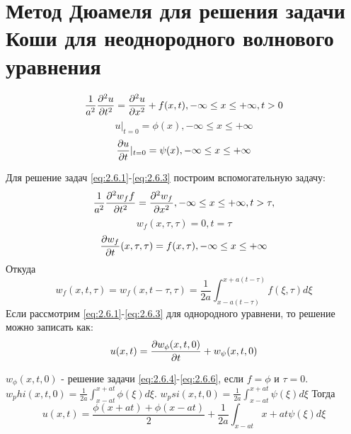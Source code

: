 \documentclass[../main.tex]{subfiles}
\begin{document}
\section{Метод Дюамеля для решения задачи Коши для неоднородного волнового уравнения}

\begin{equation}
    \label{eq:2.6.1}
    \frac{1}{a^2}\frac{\partial ^2u}{\partial t^2} = \frac{\partial ^2u}{\partial x^2} + f(x, t), -\infty \leq x \leq +\infty, t > 0
\end{equation}
\begin{equation}
    \label{eq:2.6.2}
    u|_{t=0} = \phi(x), -\infty \leq x \leq +\infty
\end{equation}
\begin{equation}
    \label{eq:2.6.3}
    \frac{\partial u}{\partial t}|_{t=0}=\psi(x), -\infty \leq x \leq +\infty
\end{equation}

Для решение задач \eqref{eq:2.6.1}-\eqref{eq:2.6.3} построим вспомогательную задачу: 
\begin{equation}
    \label{eq:2.6.4}
    \frac{1}{a^2}\frac{\partial ^2w_ff}{\partial t^2}=\frac{\partial ^2w_f}{\partial x^2}, -\infty \leq x \leq +\infty, t > \tau,
\end{equation}
\begin{equation}
    \label{eq:2.6.5}
    w_f(x, \tau, \tau) = 0, t = \tau
\end{equation}
\begin{equation}
    \label{eq:2.6.6}
    \frac{\partial w_f}{\partial t}(x, \tau, \tau) = f(x, \tau), -\infty \leq x \leq +\infty
\end{equation}
Откуда 
$$
    w_f(x, t, \tau)=w_f(x, t-\tau,\tau) = \frac{1}{2a}\int_{x-a(t-\tau)}^{x+a(t-\tau)}f(\xi, \tau)d\xi
$$
Если рассмотрим \eqref{eq:2.6.1}-\eqref{eq:2.6.3} для однородного уравнени, то решение можно записать как:
\begin{equation}
    u(x, t)=\frac{\partial w_\phi(x, t, 0)}{\partial t} + w_\psi(x, t, 0)
\end{equation}

$w_\phi(x, t, 0)$ - решение задачи \eqref{eq:2.6.4}-\eqref{eq:2.6.6}, 
если $f = \phi$ и $\tau = 0$.
$w_phi(x, t, 0) = \frac{1}{2a}\int_{x-at}^{x+at}\phi(\xi)d\xi$. 
$w_psi(x, t, 0) = \frac{1}{2a}\int_{x-at}^{x+at}\psi(\xi)d\xi$
Тогда 
\begin{equation}
    u(x, t) = \frac{\phi(x+at) + \phi(x - at)}{2} + \frac{1}{2a}\int_{x - at}{x+at}\psi(\xi)d\xi
\end{equation}
\end{document}
